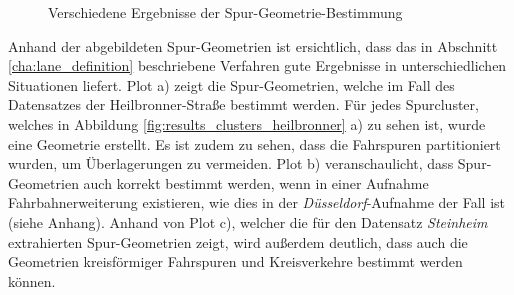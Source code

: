 \begin{figure}[H]
    \centering
    \qquad \qquad
    \hfill
    \caption[Ergebnisse Spur-Geometrie-Bestimmung]{Verschiedene Ergebnisse der Spur-Geometrie-Bestimmung}
    \label{fig:results_laneGeometries}
\end{figure}

Anhand der abgebildeten Spur-Geometrien ist ersichtlich, dass das in Abschnitt \ref{cha:lane_definition}
beschriebene Verfahren gute Ergebnisse in unterschiedlichen Situationen liefert.
Plot a) zeigt die Spur-Geometrien, welche im Fall des Datensatzes der Heilbronner-Straße bestimmt werden.
Für jedes Spurcluster, welches in Abbildung \ref{fig:results_clusters_heilbronner} a) zu sehen ist, wurde eine Geometrie erstellt.
Es ist zudem zu sehen, dass die Fahrspuren partitioniert wurden, um Überlagerungen zu vermeiden.
Plot b) veranschaulicht, dass Spur-Geometrien auch korrekt bestimmt werden, wenn in einer Aufnahme
Fahrbahnerweiterung existieren, wie dies in der \textit{Düsseldorf}-Aufnahme der Fall ist (siehe Anhang).
Anhand von Plot c), welcher die für den Datensatz \textit{Steinheim} extrahierten Spur-Geometrien zeigt, wird
außerdem deutlich, dass auch die Geometrien kreisförmiger Fahrspuren und Kreisverkehre bestimmt werden können.

